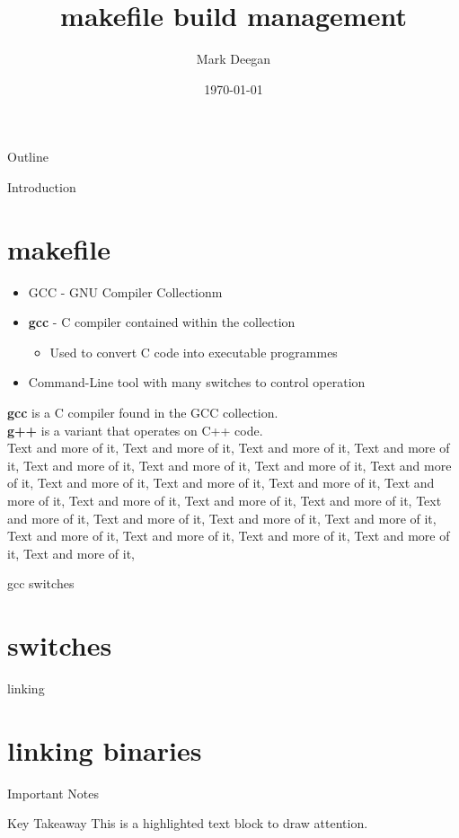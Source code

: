 \documentclass{beamer}
\title{\textbf{makefile build management}}
\author{Mark Deegan}
\institute{TU Dublin}
\date{\today}
\begin{document}
\begin{frame}
    \maketitle
\end{frame}

\begin{frame}{Outline}
    \tableofcontents
\end{frame}

\begin{frame}[allowframebreaks]{Introduction}
    \section{makefile}
    \begin{itemize}
        \item GCC - GNU Compiler Collectionm
        \item \textbf{gcc} - C compiler contained within the collection
        \begin{itemize}
            \item Used to convert C code into executable programmes
        \end{itemize}
        \item Command-Line tool with many switches to control operation
    \end{itemize}
    \textbf{gcc} is a C compiler found in the GCC collection.
    \\
    \textbf{g++} is a variant that operates on C++ code.
    \\
    \framebreak
    Text and more of it, Text and more of it, Text and more of it, Text and more of it, Text and more of it, Text and more of it, Text and more of it, Text and more of it, Text and more of it, Text and more of it, Text and more of it, Text and more of it, Text and more of it, \framebreak
    Text and more of it, Text and more of it, Text and more of it, Text and more of it, Text and more of it, Text and more of it, Text and more of it, Text and more of it, Text and more of it, Text and more of it, Text and more of it, 
\end{frame}

\begin{frame}[allowframebreaks]{gcc switches}
    \section{switches}
\end{frame}

\begin{frame}[allowframebreaks]{linking}
    \section{linking binaries}
\end{frame}

\begin{frame}{Important Notes}
    \begin{block}{Key Takeaway}
        This is a highlighted text block to draw attention.
    \end{block}
\end{frame}
\end{document}
